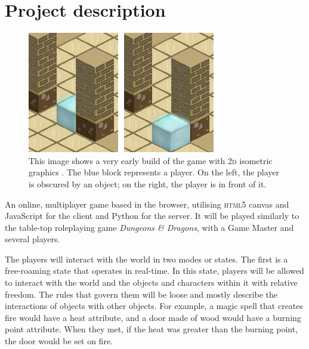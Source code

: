 \documentclass[11pt,fleqn,twoside]{article}
\begin{document}
\wordcount{}

\mmp

\setcounter{tocdepth}{3} %


\section{Project description}

\begin{figure}
\centering
	\includegraphics[scale=0.7]{figures/figure-1.png}
	\caption{This image shows a very early build of the game with \textsc{2d} isometric graphics \cite{GameArt}. The blue block represents a player. On the left, the player is obscured by an object; on the right, the player is in front of it.\label{figure_1}}
\end{figure}

An online, multiplayer game based in the browser, utilising \textsc{html5} canvas and JavaScript for the client and Python for the server. It will be played similarly to the table-top roleplaying game \textit{Dungeons \& Dragons}, with a Game Master and several players.

The players will interact with the world in two modes or states. The first is a free-roaming state that operates in real-time. In this state, players will be allowed to interact with the world and the objects and characters within it with relative freedom. The rules that govern them will be loose and mostly describe the interactions of objects with other objects. For example, a magic spell that creates fire would have a heat attribute, and a door made of wood would have a burning point attribute. When they met, if the heat was greater than the burning point, the door would be set on fire.
\end{document}
